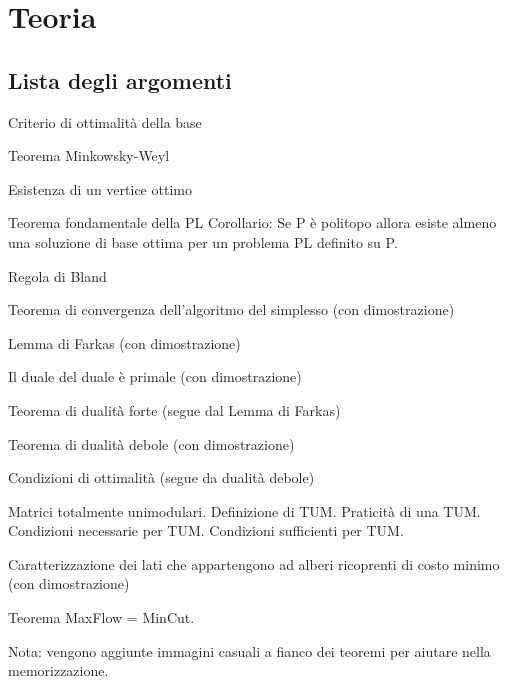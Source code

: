 \documentclass[\main/main.tex]{subfiles}
\begin{document}
\chapter{Teoria}

\section*{Lista degli argomenti}
\begin{todolist}
  \item Criterio di ottimalità della base
  \item Teorema Minkowsky-Weyl
  \item Esistenza di un vertice ottimo
  \item Teorema fondamentale della PL
  \subitem Corollario: Se P è politopo allora esiste almeno una soluzione di base ottima per un problema PL definito su P.
  \item Regola di Bland
  \item Teorema di convergenza dell'algoritmo del simplesso (con dimostrazione)
  \item Lemma di Farkas (con dimostrazione)
  \item Il duale del duale è primale (con dimostrazione)
  \item Teorema di dualità forte (segue dal Lemma di Farkas)
  \item Teorema di dualità debole (con dimostrazione)
  \item Condizioni di ottimalità (segue da dualità debole)
  \item Matrici totalmente unimodulari.
  \subitem Definizione di TUM.
  \subitem Praticità di una TUM.
  \subitem Condizioni necessarie per TUM.
  \subitem Condizioni sufficienti per TUM.
  \item Caratterizzazione dei lati che appartengono ad alberi ricoprenti di costo minimo (con dimostrazione)
  \item Teorema MaxFlow = MinCut.
\end{todolist}

Nota: vengono aggiunte immagini casuali a fianco dei teoremi per aiutare nella memorizzazione.

\clearpage




\clearpage

\clearpage


\clearpage





\clearpage

\clearpage


\end{document}

